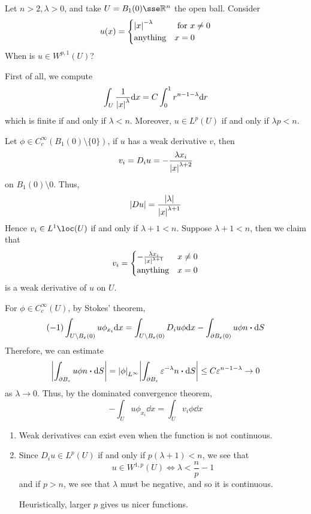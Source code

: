 \documentclass{article}
\begin{document}
\begin{example}
    Let \(n > 2, \lambda > 0\), and take \(U = B_1(0) \sse \R^n\) the open ball. Consider
    \[u(x) = \begin{cases}
        \abs{x}^{-\lambda} & \text{ for }x \ne 0 \\
        \text{anything} & x = 0
    \end{cases}\]
    When is \(u \in W^{p, 1}(U)\)?

    First of all, we compute
    \[\int_U\frac{1}{\abs{x}^\lambda}\dd x = C\int_0^1 r^{n-1-\lambda}\dd r\]
    which is finite if and only if \(\lambda < n\). Moreover, \(u \in L^p(U)\) if and only if \(\lambda p < n\).

    Let \(\phi \in C_c^\infty(B_1(0) \setminus \{0\})\), if \(u\) has a weak derivative \(v\), then
    \[v_i = D_iu = -\frac{\lambda x_i}{\abs{x}^{\lambda + 2}}\]
    on \(B_1(0)\setminus 0\). Thus,
    \[\abs{D u} = \frac{\abs{\lambda}}{\abs{x}^{\lambda + 1}}\]
    Hence \(v_i \in L^1\loc(U)\) if and only if \(\lambda + 1 < n\). Suppose \(\lambda + 1 < n\), then we claim that
    \begin{align*}
        v_i = \begin{cases}
            -\frac{\lambda x_i}{\abs{x}^{\lambda + 1}} & x \ne 0 \\
            \text{anything} & x = 0
        \end{cases}
    \end{align*}
    is a weak derivative of \(u\) on \(U\).

    For \(\phi \in C_c^\infty(U)\), by Stokes' theorem,
    \[(-1)\int_{U \setminus B_\epsilon(0)}u \phi_{x_i}\dd x = \int_{U\setminus B_\epsilon(0)}D_iu \phi \dd x - \int_{\partial B_\epsilon(0)} u \phi n \vdot \dd S\]
    Therefore, we can estimate
    \[\abs{\int_{\partial B_\epsilon}u \phi n \vdot \dd S} = \abs{\phi}_{L^\infty}\abs{\int_{\partial B_\epsilon}\epsilon^{-\lambda}n \vdot \dd S} \le C \epsilon^{n-1-\lambda} \to 0\]
    as \(\lambda \to 0\). Thus, by the dominated convergence theorem,
    \[-\int_U u \phi_{x_i}\dd x = \int_U v_i\phi \dd x\]
\end{example}

\begin{remark}
    \begin{enumerate}
        \item Weak derivatives can exist even when the function is not continuous.
        \item Since \(D_iu \in L^p(U)\) if and only if \(p(\lambda + 1) < n\), we see that
        \[u \in W^{1, p}(U) \iff \lambda < \frac{n}{p} - 1\]
        and if \(p > n\), we see that \(\lambda\) must be negative, and so it is continuous.

        Heuristically, larger \(p\) gives us nicer functions.
    \end{enumerate}
\end{remark}
\end{document}
